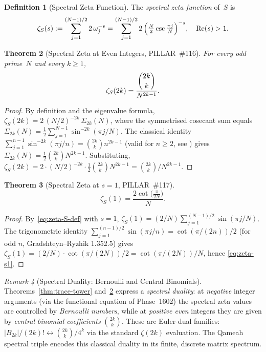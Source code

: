 \documentclass[aps,prd,twocolumn,superscriptaddress,floatfix,nofootinbib]{revtex4-2}
\newtheorem{theorem}{Theorem}
\theoremstyle{definition}
\newtheorem{definition}[theorem]{Definition}
\theoremstyle{remark}
\newtheorem{remark}[theorem]{Remark}
\begin{document}
\begin{definition}[Spectral Zeta Function]
The \emph{spectral zeta function} of~$S$ is
\begin{equation}
  \zeta_S(s) := \sum_{j=1}^{(N-1)/2} 2\,\omega_j^{-s}
             = \sum_{j=1}^{(N-1)/2} 2\,
               \Bigl(\tfrac{N}{2}\csc\tfrac{\pi j}{N}\Bigr)^{-s},
               \quad \operatorname{Re}(s)>1.
  \label{eq:zeta-S-def}
\end{equation}
\end{definition}

\begin{theorem}[Spectral Zeta at Even Integers, PILLAR~\#116]
\label{thm:zeta-even}
For every odd prime~$N$ and every $k \ge 1$,
\begin{equation}
  \zeta_S(2k) = \frac{\dbinom{2k}{k}}{N^{2k-1}}.
  \label{eq:zeta-even}
\end{equation}
\end{theorem}

\begin{proof}
By definition and the eigenvalue formula,
$\zeta_S(2k)
   = 2\,(N/2)^{-2k}\,\Sigma_{2k}(N)$,
where the symmetrised cosecant sum equals
$\Sigma_{2k}(N) = \tfrac{1}{2}\sum_{j=1}^{N-1}\sin^{-2k}(\pi j/N)$.
The classical identity
$\sum_{j=1}^{n-1}\sin^{-2k}(\pi j/n) = \binom{2k}{k}n^{2k-1}$
(valid for $n \ge 2$, see \cite{berndt1975}) gives
$\Sigma_{2k}(N)= \tfrac{1}{2}\binom{2k}{k}N^{2k-1}$.
Substituting,
$\zeta_S(2k)= 2\cdot(N/2)^{-2k}\cdot\tfrac{1}{2}\binom{2k}{k}N^{2k-1}
= \binom{2k}{k}/N^{2k-1}$.
\end{proof}

\begin{theorem}[Spectral Zeta at $s=1$, PILLAR~\#117]
\label{thm:zeta-s1}
\begin{equation}
  \zeta_S(1) = \frac{2\cot\!\bigl(\tfrac{\pi}{2N}\bigr)}{N}.
  \label{eq:zeta-s1}
\end{equation}
\end{theorem}

\begin{proof}
By~\eqref{eq:zeta-S-def} with $s=1$,
$\zeta_S(1) = (2/N)\sum_{j=1}^{(N-1)/2}\sin(\pi j/N)$.
The trigonometric identity
$\sum_{j=1}^{(n-1)/2}\sin(\pi j/n) = \cot(\pi/(2n))/2$
(for odd $n$, Gradshteyn--Ryzhik 1.352.5) gives
$\zeta_S(1) = (2/N)\cdot\cot(\pi/(2N))/2 = \cot(\pi/(2N))/N$,
hence \eqref{eq:zeta-s1}.
\end{proof}

\begin{remark}[Spectral Duality: Bernoulli and Central Binomials]
\label{rem:spectral-duality}
Theorems~\ref{thm:trace-tower} and~\ref{thm:zeta-even} express a
\emph{spectral duality}: at \emph{negative} integer arguments (via the functional
equation of Phase~1602) the spectral zeta values are controlled by
\emph{Bernoulli numbers}, while at \emph{positive even} integers they are given
by \emph{central binomial coefficients} $\binom{2k}{k}$.
These are Euler-dual families: $|B_{2k}|/(2k)! \leftrightarrow \binom{2k}{k}/4^k$
via the standard $\zeta(2k)$ evaluation.  The Qameah spectral triple encodes this
classical duality in its finite, discrete matrix spectrum.
\end{remark}
\end{document}
